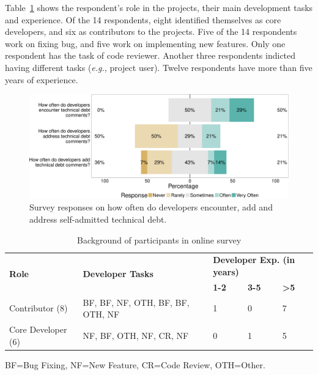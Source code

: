 Table~\ref{survey_responses} shows the respondent's role in the projects, their main development tasks and experience. Of the 14 respondents, eight identified themselves as core developers, and six as contributors to the projects. Five of the 14 respondents work on fixing bug, and five work on implementing new features. Only one respondent has the task of code reviewer. Another three respondents indicted having different tasks (\emph{e.g.}, project user). Twelve respondents have more than five years of experience.


\begin{figure}[tb]
	\centering
	\includegraphics[width=0.95\columnwidth]{figures/test/_responses_question_.pdf}
	\caption{Survey responses on how often do developers encounter, add and address self-admitted technical debt.}
	\label{fig:encouner_add_address}
\end{figure}

\begin{table}[t]
	\centering
	\caption{Background of participants in online survey}
	\label{survey_responses}
	\begin{tabular}{l|p{1.2in}|l|l|l}
		\toprule
		\multirow{2}{*}{\textbf{Role}} & \multirow{2}{*}{\textbf{Developer Tasks}} & \multicolumn{3}{p{.8in}}{\textbf{Developer Exp. (in years)}} \\ \cline{3-5} 
		&  & \textbf{1-2} & \textbf{3-5} & \textbf{\textgreater5} \\ \hline
		Contributor (8)& BF, BF, NF, OTH, BF, BF, OTH, NF & 1 & 0 & 7 \\
		Core Developer (6) & NF, BF, OTH, NF, CR, NF & 0 & 1 & 5 \\ \bottomrule
			
			
	\end{tabular}
	
	BF=Bug Fixing, NF=New Feature, CR=Code Review, OTH=Other.
\end{table}


